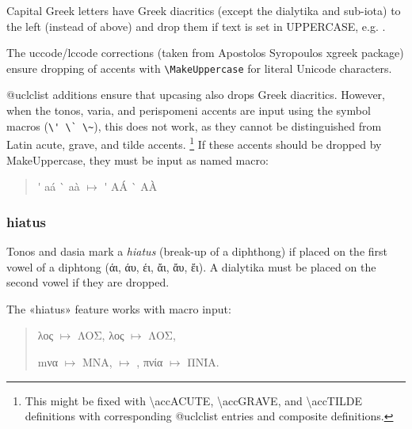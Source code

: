 \documentclass[a4paper]{article}
\begin{document}
Capital Greek letters have Greek diacritics (except the dialytika and
sub-iota) to the left (instead of above) and drop them if text is set in
UPPERCASE, e.g.
.

The uccode/lccode corrections (taken from Apostolos Syropoulos xgreek
package) ensure dropping of accents with \verb|\MakeUppercase| for literal
Unicode characters.

@uclclist additions ensure that upcasing also drops Greek diacritics.
However, when the tonos, varia, and perispomeni accents
are input using the symbol macros (\verb|\' \` \~|), this does not work, as
they cannot be distinguished from Latin acute, grave, and tilde accents.%
\footnote{This might be fixed with \textbackslash accACUTE,
          \textbackslash accGRAVE, and  \textbackslash accTILDE definitions
          with corresponding @uclclist entries and composite definitions.}
If these accents should be dropped by MakeUppercase, they must be input as
named macro:

\begin{quote}
\acctonos\textalpha       \'\textalpha{}  \acctonos a\'a
\accvaria\textalpha       \`\textalpha{}  \accvaria a\`a
$\mapsto$
\MakeUppercase{
\acctonos\textalpha       \'\textalpha{}  \acctonos a\'a
\accvaria\textalpha       \`\textalpha{}  \accvaria a\`a
}
\end{quote}

\subsubsection{hiatus}

Tonos and dasia mark a \emph{hiatus} (break-up of a diphthong) if placed on
the first vowel of a diphtong (άι, άυ, έι, ἄι, ἄυ, ἔι). A dialytika must be
placed on the second vowel if they are dropped.

The «hiatus» feature works with macro input:
\begin{quote}
  \acctonos\textalpha\textupsilon λος $\mapsto$
  \MakeUppercase{\acctonos\textalpha\textupsilon λος},
  \accpsilioxia\textalpha\textupsilon λος $\mapsto$
  \MakeUppercase{\accpsilioxia\textalpha\textupsilon λος},

  m\acctonos\textalpha\textiota να $\mapsto$
  \MakeUppercase{m\acctonos\textalpha\textiota να},
  \textkappa\acctonos\textepsilon\textiota\textkappa $\mapsto$
  \MakeUppercase{\textkappa\acctonos\textepsilon\textiota\textkappa},
  \accpsili\textalpha\textupsilon πνία $\mapsto$
  \MakeUppercase{\accpsili\textalpha\textupsilon πνία}.
\end{quote}
\end{document}
